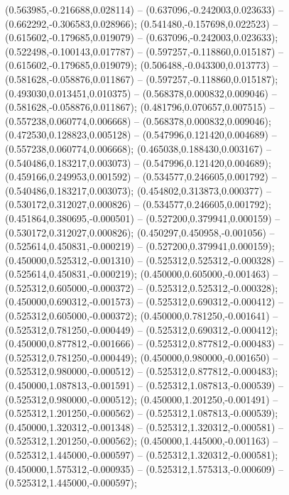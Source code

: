  (0.563985,-0.216688,0.028114) -- (0.637096,-0.242003,0.023633) -- (0.662292,-0.306583,0.028966);
 (0.541480,-0.157698,0.022523) -- (0.615602,-0.179685,0.019079) -- (0.637096,-0.242003,0.023633);
 (0.522498,-0.100143,0.017787) -- (0.597257,-0.118860,0.015187) -- (0.615602,-0.179685,0.019079);
 (0.506488,-0.043300,0.013773) -- (0.581628,-0.058876,0.011867) -- (0.597257,-0.118860,0.015187);
 (0.493030,0.013451,0.010375) -- (0.568378,0.000832,0.009046) -- (0.581628,-0.058876,0.011867);
 (0.481796,0.070657,0.007515) -- (0.557238,0.060774,0.006668) -- (0.568378,0.000832,0.009046);
 (0.472530,0.128823,0.005128) -- (0.547996,0.121420,0.004689) -- (0.557238,0.060774,0.006668);
 (0.465038,0.188430,0.003167) -- (0.540486,0.183217,0.003073) -- (0.547996,0.121420,0.004689);
 (0.459166,0.249953,0.001592) -- (0.534577,0.246605,0.001792) -- (0.540486,0.183217,0.003073);
 (0.454802,0.313873,0.000377) -- (0.530172,0.312027,0.000826) -- (0.534577,0.246605,0.001792);
 (0.451864,0.380695,-0.000501) -- (0.527200,0.379941,0.000159) -- (0.530172,0.312027,0.000826);
 (0.450297,0.450958,-0.001056) -- (0.525614,0.450831,-0.000219) -- (0.527200,0.379941,0.000159);
 (0.450000,0.525312,-0.001310) -- (0.525312,0.525312,-0.000328) -- (0.525614,0.450831,-0.000219);
 (0.450000,0.605000,-0.001463) -- (0.525312,0.605000,-0.000372) -- (0.525312,0.525312,-0.000328);
 (0.450000,0.690312,-0.001573) -- (0.525312,0.690312,-0.000412) -- (0.525312,0.605000,-0.000372);
 (0.450000,0.781250,-0.001641) -- (0.525312,0.781250,-0.000449) -- (0.525312,0.690312,-0.000412);
 (0.450000,0.877812,-0.001666) -- (0.525312,0.877812,-0.000483) -- (0.525312,0.781250,-0.000449);
 (0.450000,0.980000,-0.001650) -- (0.525312,0.980000,-0.000512) -- (0.525312,0.877812,-0.000483);
 (0.450000,1.087813,-0.001591) -- (0.525312,1.087813,-0.000539) -- (0.525312,0.980000,-0.000512);
 (0.450000,1.201250,-0.001491) -- (0.525312,1.201250,-0.000562) -- (0.525312,1.087813,-0.000539);
 (0.450000,1.320312,-0.001348) -- (0.525312,1.320312,-0.000581) -- (0.525312,1.201250,-0.000562);
 (0.450000,1.445000,-0.001163) -- (0.525312,1.445000,-0.000597) -- (0.525312,1.320312,-0.000581);
 (0.450000,1.575312,-0.000935) -- (0.525312,1.575313,-0.000609) -- (0.525312,1.445000,-0.000597);
